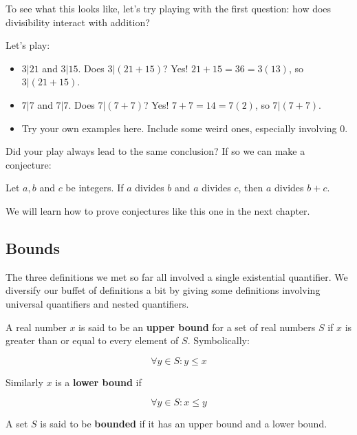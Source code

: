 To see what this looks like, let's try playing with the first question:  how does divisibility interact with addition?

Let's play:

\begin{itemize}
	\item $3|21$ and $3|15$.  Does $3|(21+15)$? Yes!  $21+15 = 36 = 3(13)$, so $3|(21+15)$.
	\item $7|7$ and $7|7$.  Does $7|(7+7)$?   Yes!  $7+7  =14 = 7(2)$, so $7|(7+7)$.
	\item Try your own examples here.  Include some weird ones, especially involving $0$.
\end{itemize}


Did your play always lead to the same conclusion?  If so we can make a conjecture:

\begin{conjecture}
	Let $a,b$ and $c$ be integers.  If $a$ divides $b$ and $a$ divides $c$, then $a$ divides $b+c$.
\end{conjecture}

We will learn how to prove conjectures like this one in the next chapter.

\subsection{Bounds}

The three definitions we met so far all involved a single existential quantifier.  We diversify our buffet of definitions a bit by giving some definitions involving universal quantifiers and nested quantifiers.

\begin{definition}
		A real number $x$ is said to be an \textbf{upper bound} for a set of real numbers $S$ if $x$ is greater than or equal to every element of $S$.  Symbolically:
		
		\[
		\forall y \in S: y \leq x
		\]
		
		Similarly $x$ is a \textbf{lower bound} if
		
		\[
		\forall y \in S: x \leq y
		\]
		
		A set $S$ is said to be \textbf{bounded} if it has an upper bound and a lower bound.
\end{definition}

